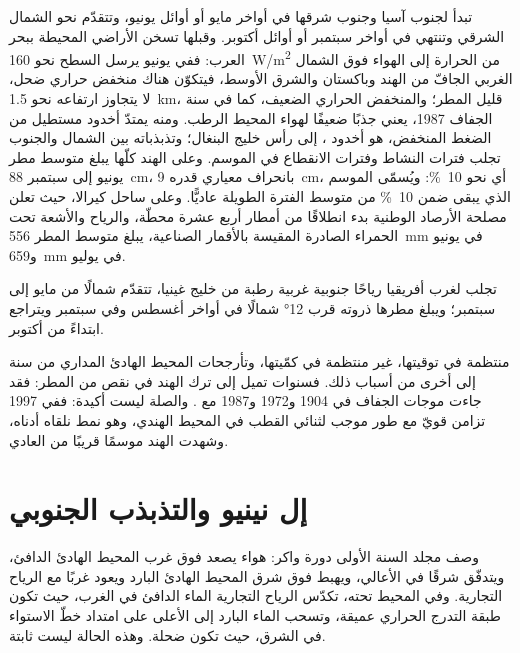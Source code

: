 تبدأ  لجنوب آسيا وجنوب شرقها في أواخر مايو أو أوائل يونيو، وتتقدّم
نحو الشمال الشرقي وتنتهي في أواخر سبتمبر أو أوائل أكتوبر. وقبلها تسخن الأراضي المحيطة
ببحر العرب: ففي يونيو يرسل السطح نحو \qty{160}{W/m^2} من الحرارة إلى الهواء فوق
الشمال الغربي الجافّ من الهند وباكستان والشرق الأوسط، فيتكوّن هناك منخفض حراري ضحل،
لا يتجاوز ارتفاعه نحو \qty{1.5}{km}، قليل المطر؛ والمنخفض الحراري الضعيف، كما في سنة الجفاف
1987، يعني جذبًا ضعيفًا لهواء المحيط الرطب. ومنه يمتدّ أخدود مستطيل من الضغط المنخفض، هو أخدود
، إلى رأس خليج البنغال؛ وتذبذباته بين الشمال والجنوب تجلب فترات
النشاط وفترات الانقطاع في الموسم. وعلى الهند كلّها يبلغ متوسط مطر يونيو إلى سبتمبر
\qty{88}{cm}، بانحراف معياري قدره \qty{9}{cm}، أي نحو \qty{10}{\percent}: ويُسمّى الموسم الذي يبقى ضمن
\qty{10}{\percent} من متوسط الفترة الطويلة عاديًّا. وعلى ساحل كيرالا، حيث تعلن
مصلحة الأرصاد الوطنية بدء  انطلاقًا من أمطار أربع عشرة محطّة،
والرياح والأشعة تحت الحمراء الصادرة المقيسة بالأقمار الصناعية، يبلغ متوسط المطر
\qty{556}{mm} في يونيو و\qty{659}{mm} في يوليو.

تجلب  لغرب أفريقيا رياحًا جنوبية غربية رطبة من خليج غينيا، تتقدّم
شمالًا من مايو إلى سبتمبر؛ ويبلغ مطرها ذروته قرب \ang{12} شمالًا في أواخر أغسطس وفي سبتمبر
ويتراجع ابتداءً من أكتوبر.

 منتظمة في توقيتها، غير منتظمة في كمّيتها، وتأرجحات المحيط الهادئ المداري
من سنة إلى أخرى من أسباب ذلك. فسنوات  تميل إلى ترك الهند في نقص من المطر:
فقد جاءت موجات الجفاف في 1904 و1972 و1987 مع . والصلة ليست أكيدة: ففي 1997 تزامن
 قويّ مع طور موجب لثنائي القطب في المحيط الهندي، وهو نمط نلقاه أدناه، وشهدت الهند
موسمًا قريبًا من العادي.

\section{إل نينيو والتذبذب الجنوبي}\label{sec:b2:climate-variability:enso}

وصف مجلد السنة الأولى دورة واكر: هواء يصعد فوق غرب المحيط الهادئ الدافئ،
ويتدفّق شرقًا في الأعالي، ويهبط فوق شرق المحيط الهادئ البارد ويعود غربًا مع الرياح
التجارية. وفي المحيط تحته، تكدّس الرياح التجارية الماء الدافئ في الغرب، حيث تكون طبقة التدرج الحراري
عميقة، وتسحب الماء البارد إلى الأعلى على امتداد خطّ الاستواء في الشرق، حيث تكون ضحلة. وهذه الحالة ليست
ثابتة.

